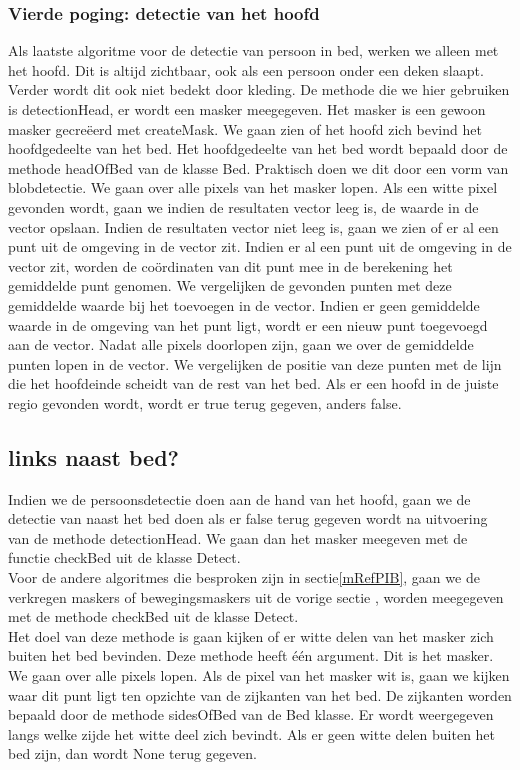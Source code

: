 \subsubsection{Vierde poging: detectie van het hoofd}
Als laatste algoritme voor de detectie van persoon in bed, werken we alleen met het hoofd. Dit is altijd zichtbaar, ook als een persoon onder een deken slaapt. Verder wordt dit ook niet bedekt door kleding. De methode die we hier gebruiken is detectionHead, er wordt een masker meegegeven. Het masker is een gewoon masker gecre\"eerd met createMask. We gaan zien of het hoofd zich bevind het hoofdgedeelte van het bed. Het hoofdgedeelte van het bed wordt bepaald door de methode headOfBed van de klasse Bed. Praktisch doen we dit door een vorm van blobdetectie. We gaan over alle pixels van het masker lopen. Als een witte pixel gevonden wordt, gaan we indien de resultaten vector leeg is, de waarde in de vector opslaan. Indien de resultaten vector niet leeg is, gaan we zien of er al een punt uit de omgeving in de vector zit. Indien er al een punt uit de omgeving in de vector zit, worden de co\"ordinaten van dit punt mee in de berekening het gemiddelde punt genomen. We vergelijken de gevonden punten met deze gemiddelde waarde bij het toevoegen in de vector. Indien er geen gemiddelde waarde in de omgeving van het punt ligt, wordt er een nieuw punt toegevoegd aan de vector.  Nadat alle pixels doorlopen zijn, gaan we over de gemiddelde punten lopen in de vector. We vergelijken de positie van deze punten met de lijn die het hoofdeinde scheidt van de rest van het bed. Als er een hoofd in de juiste regio gevonden wordt, wordt er true terug gegeven, anders false.

\subsection{links naast bed?}
Indien we de persoonsdetectie doen aan de hand van het hoofd, gaan we de detectie van naast het bed doen als er false terug gegeven wordt na uitvoering van de methode detectionHead. We gaan dan het masker meegeven met de functie checkBed uit de klasse Detect.\\
Voor de andere algoritmes die besproken zijn in sectie\ref{mRefPIB}, gaan we  de verkregen maskers of bewegingsmaskers uit de vorige sectie , worden meegegeven met de methode checkBed uit de klasse Detect.\\
Het doel van deze methode is gaan kijken of er witte delen van het masker zich buiten het bed bevinden. Deze methode heeft \'e\'en argument. Dit is het masker. We gaan over alle pixels lopen. Als de pixel van het masker wit is, gaan we kijken waar dit punt ligt ten opzichte van de zijkanten van het bed. De zijkanten worden bepaald door de methode sidesOfBed van de Bed klasse. Er wordt weergegeven langs welke zijde het witte deel zich bevindt. Als er geen witte delen buiten het bed zijn, dan wordt None terug gegeven.
